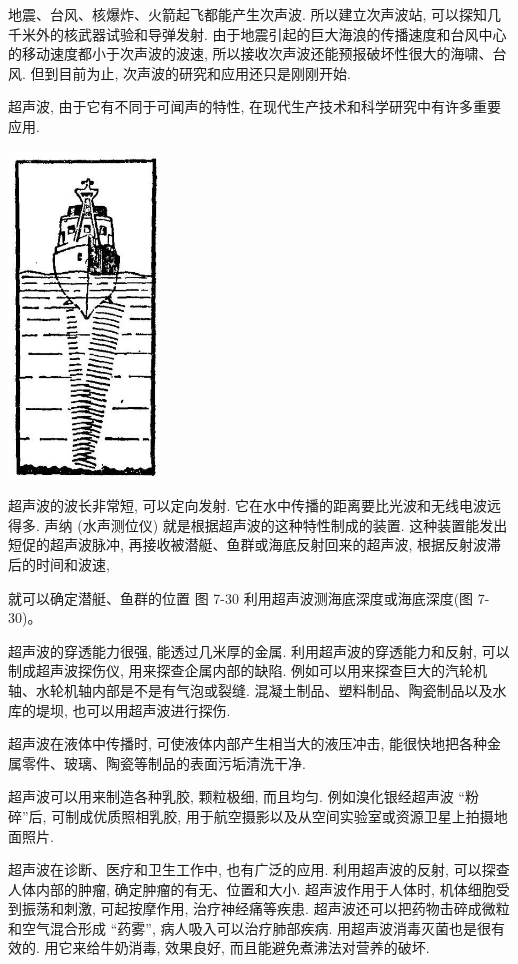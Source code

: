 \documentclass[10pt]{article}
\begin{document}
地震、台风、核爆炸、火箭起飞都能产生次声波. 所以建立次声波站, 可以探知几千米外的核武器试验和导弹发射. 由于地震引起的巨大海浪的传播速度和台风中心的移动速度都小于次声波的波速, 所以接收次声波还能预报破坏性很大的海啸、台风. 但到目前为止, 次声波的研究和应用还只是刚刚开始.

超声波, 由于它有不同于可闻声的特性, 在现代生产技术和科学研究中有许多重要应用.

\begin{center}
\includegraphics[max width=0.3\textwidth]{images/01912d55-147c-70aa-b0e0-1782a122f948_227_985358.jpg}
\end{center}

超声波的波长非常短, 可以定向发射. 它在水中传播的距离要比光波和无线电波远得多. 声纳 (水声测位仪) 就是根据超声波的这种特性制成的装置. 这种装置能发出短促的超声波脉冲, 再接收被潜艇、鱼群或海底反射回来的超声波, 根据反射波滞后的时间和波速,

就可以确定潜艇、鱼群的位置 图 7-30 利用超声波测海底深度或海底深度(图 7-30)。

超声波的穿透能力很强, 能透过几米厚的金属. 利用超声波的穿透能力和反射, 可以制成超声波探伤仪, 用来探查企属内部的缺陷. 例如可以用来探查巨大的汽轮机轴、水轮机轴内部是不是有气泡或裂缝. 混凝土制品、塑料制品、陶瓷制品以及水库的堤坝, 也可以用超声波进行探伤.

超声波在液体中传播时, 可使液体内部产生相当大的液压冲击, 能很快地把各种金属零件、玻璃、陶瓷等制品的表面污垢清洗干净.

超声波可以用来制造各种乳胶, 颗粒极细, 而且均匀. 例如溴化银经超声波 “粉碎”后, 可制成优质照相乳胶, 用于航空摄影以及从空间实验室或资源卫星上拍摄地面照片.

超声波在诊断、医疗和卫生工作中, 也有广泛的应用. 利用超声波的反射, 可以探查人体内部的肿瘤, 确定肿瘤的有无、位置和大小. 超声波作用于人体时, 机体细胞受到振荡和刺激, 可起按摩作用, 治疗神经痛等疾患. 超声波还可以把药物击碎成微粒和空气混合形成 “药雾”, 病人吸入可以治疗肺部疾病. 用超声波消毒灭菌也是很有效的. 用它来给牛奶消毒, 效果良好, 而且能避免煮沸法对营养的破坏.
\end{document}
